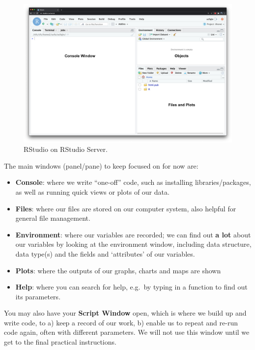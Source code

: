 \documentclass[
]{book}
\providecommand{\tightlist}{%
  \setlength{\itemsep}{0pt}\setlength{\parskip}{0pt}}
\begin{document}
\begin{figure}

{\centering \includegraphics[width=0.9\linewidth]{images/w04/rstudio_interface} 

}

\caption{RStudio on RStudio Server.}\label{fig:04-rstudio-interface-script}
\end{figure}

The main windows (panel/pane) to keep focused on for now are:

\begin{itemize}
\tightlist
\item
  \textbf{Console}: where we write ``one-off'' code, such as installing libraries/packages, as well as running quick views or plots of our data.
\item
  \textbf{Files}: where our files are stored on our computer system, also helpful for general file management.
\item
  \textbf{Environment}: where our variables are recorded; we can find out \textbf{a lot} about our variables by looking at the environment window, including data structure, data type(s) and the fields and `attributes' of our variables.
\item
  \textbf{Plots}: where the outputs of our graphs, charts and maps are shown
\item
  \textbf{Help}: where you can search for help, e.g.~by typing in a function to find out its parameters.
\end{itemize}

You may also have your \textbf{Script Window} open, which is where we build up and write code, to a) keep a record of our work, b) enable us to repeat and re-run code again, often with different parameters. We will not use this window until we get to the final practical instructions.
\end{document}
